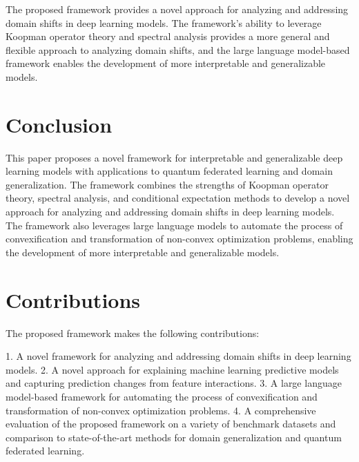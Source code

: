 \documentclass{article}
\begin{document}
The proposed framework provides a novel approach for analyzing and addressing domain shifts in deep learning models. The framework's ability to leverage Koopman operator theory and spectral analysis provides a more general and flexible approach to analyzing domain shifts, and the large language model-based framework enables the development of more interpretable and generalizable models.

\section{Conclusion}

This paper proposes a novel framework for interpretable and generalizable deep learning models with applications to quantum federated learning and domain generalization. The framework combines the strengths of Koopman operator theory, spectral analysis, and conditional expectation methods to develop a novel approach for analyzing and addressing domain shifts in deep learning models. The framework also leverages large language models to automate the process of convexification and transformation of non-convex optimization problems, enabling the development of more interpretable and generalizable models.

\section{Contributions}

The proposed framework makes the following contributions:

1. A novel framework for analyzing and addressing domain shifts in deep learning models.
2. A novel approach for explaining machine learning predictive models and capturing prediction changes from feature interactions.
3. A large language model-based framework for automating the process of convexification and transformation of non-convex optimization problems.
4. A comprehensive evaluation of the proposed framework on a variety of benchmark datasets and comparison to state-of-the-art methods for domain generalization and quantum federated learning.
\end{document}
